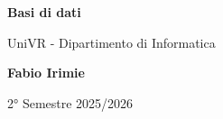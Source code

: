 \begin{titlepage}
	\begin{center}
		\vspace*{1cm}

		\Huge
		\textbf{Basi di dati}

		\vspace{0.5cm}
		\LARGE
		UniVR - Dipartimento di Informatica

		\vspace{1.5cm}

		\textbf{Fabio Irimie}

		\vfill


		\vspace{0.8cm}


		2° Semestre 2025/2026

	\end{center}
\end{titlepage}
